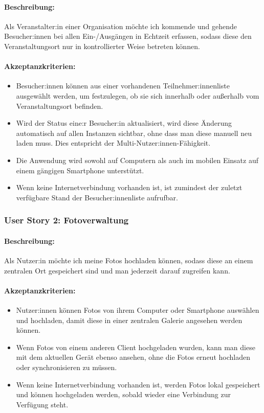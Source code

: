 \documentclass[a4paper,12pt,twoside]{scrreprt}
\begin{document}
\paragraph*{Beschreibung:} Als Veranstalter:in einer Organisation möchte ich kommende und gehende Besucher:innen bei allen Ein-/Ausgängen in Echtzeit erfassen, sodass diese den Veranstaltungsort nur in kontrollierter Weise betreten können.

\paragraph*{Akzeptanzkriterien:}

\begin{itemize}
    \item Besucher:innen können aus einer vorhandenen Teilnehmer:innenliste ausgewählt werden, um festzulegen, ob sie sich innerhalb oder außerhalb vom Veranstaltungsort befinden.
    \item Wird der Status eine:r Besucher:in aktualisiert, wird diese Änderung automatisch auf allen Instanzen sichtbar, ohne dass man diese manuell neu laden muss. Dies entspricht der Multi-Nutzer:innen-Fähigkeit.
    \item Die Anwendung wird sowohl auf Computern als auch im mobilen Einsatz auf einem gängigen Smartphone unterstützt.
    \item Wenn keine Internetverbindung vorhanden ist, ist zumindest der zuletzt verfügbare Stand der Besucher:innenliste aufrufbar.
\end{itemize}

\subsubsection*{User Story 2: Fotoverwaltung}
\label{sub-sub-sec:user-story-2}

\paragraph*{Beschreibung:} Als Nutzer:in möchte ich meine Fotos hochladen können, sodass diese an einem zentralen Ort gespeichert sind und man jederzeit darauf zugreifen kann.

\paragraph*{Akzeptanzkriterien:}

\begin{itemize}
    \item Nutzer:innen können Fotos von ihrem Computer oder Smartphone auswählen und hochladen, damit diese in einer zentralen Galerie angesehen werden können.
    \item Wenn Fotos von einem anderen Client hochgeladen wurden, kann man diese mit dem aktuellen Gerät ebenso ansehen, ohne die Fotos erneut hochladen oder synchronisieren zu müssen.
    \item Wenn keine Internetverbindung vorhanden ist, werden Fotos lokal gespeichert und können hochgeladen werden, sobald wieder eine Verbindung zur Verfügung steht.
\end{itemize}
\end{document}
